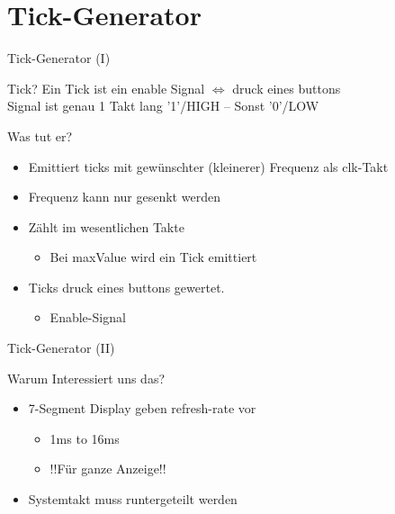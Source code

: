 \documentclass[aspectratio=169,presentation]{beamer}
\begin{document}

\section{Tick-Generator}
\begin{frame} {Tick-Generator (I)}
  \begin{exampleblock} {Tick?}
    Ein Tick ist ein enable Signal $\Leftrightarrow$ druck eines buttons\\
    Signal ist genau 1 Takt lang '1'/HIGH -- Sonst '0'/LOW
  \end{exampleblock}
  \begin{block} {Was tut er?}
    \begin{itemize}
      \item Emittiert ticks mit gewünschter (kleinerer) Frequenz als clk-Takt
      \item Frequenz kann nur gesenkt werden
      \item Zählt im wesentlichen Takte
      \begin{itemize}
        \item Bei maxValue wird ein Tick emittiert
      \end{itemize}
      \item Ticks druck eines buttons gewertet.
      \begin{itemize}
        \item Enable-Signal 
      \end{itemize}
    \end{itemize}
  \end{block}
\end{frame}

\begin{frame} {Tick-Generator (II)}
  \begin{block} {Warum Interessiert uns das?}
    \begin{itemize}
      \item 7-Segment Display geben refresh-rate vor
      \begin{itemize}
        \item 1ms to 16ms
        \item !!Für ganze Anzeige!!
      \end{itemize}
      \item Systemtakt muss runtergeteilt werden
    \end{itemize}
  \end{block}
\end{frame}
\end{document}

